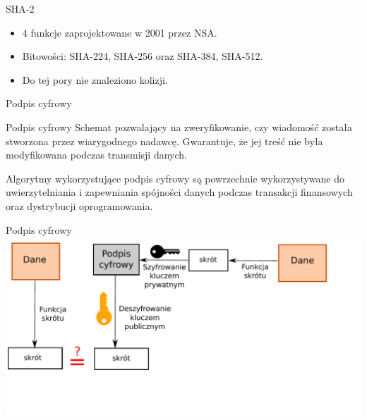 \begin{frame}{SHA-2}
	\begin{itemize}
		\item 4 funkcje zaprojektowane w 2001 przez NSA.
		\item Bitowości: SHA-224, SHA-256 oraz SHA-384, SHA-512.
		\item Do tej pory nie znaleziono kolizji.
	\end{itemize}
\end{frame}

\begin{frame}{Podpis cyfrowy}
	\begin{alertblock}{Podpis cyfrowy}
		Schemat pozwalający na zweryfikowanie, czy wiadomość została stworzona przez wiarygodnego nadawcę. Gwarantuje, że jej treść nie była modyfikowana podczas transmisji danych.
	\end{alertblock}	
	Algorytmy wykorzystujące podpis cyfrowy są powrzechnie wykorzystywane	 do uwierzytelniania i zapewniania spójności danych podczas transakcji finansowych oraz dystrybucji oprogramowania. 
\end{frame}

\begin{frame}{Podpis cyfrowy}
		\includegraphics[height=0.5\paperwidth]{images/dig-sign.pdf}
\end{frame}
